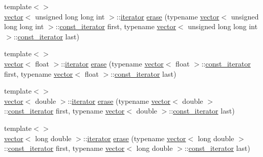 \begin{DoxyCompactItemize}
\item 
{\footnotesize template$<$$>$ }\\\mbox{\hyperlink{classvector}{vector}}$<$ unsigned long long int $>$\+::\mbox{\hyperlink{classvector_a35c955cacac6aacaa1e82874b1628865}{iterator}} \mbox{\hyperlink{classvector_a12ff8acbe48298ba7ed04be41cf6ca5f}{erase}} (typename \mbox{\hyperlink{classvector}{vector}}$<$ unsigned long long int $>$\+::\mbox{\hyperlink{classvector_a2fc97dce62b7053449cc868607540dba}{const\+\_\+iterator}} first, typename \mbox{\hyperlink{classvector}{vector}}$<$ unsigned long long int $>$\+::\mbox{\hyperlink{classvector_a2fc97dce62b7053449cc868607540dba}{const\+\_\+iterator}} last)
\item 
{\footnotesize template$<$$>$ }\\\mbox{\hyperlink{classvector}{vector}}$<$ float $>$\+::\mbox{\hyperlink{classvector_a35c955cacac6aacaa1e82874b1628865}{iterator}} \mbox{\hyperlink{classvector_a963ac95d7d6ee8c509f34f236fa17996}{erase}} (typename \mbox{\hyperlink{classvector}{vector}}$<$ float $>$\+::\mbox{\hyperlink{classvector_a2fc97dce62b7053449cc868607540dba}{const\+\_\+iterator}} first, typename \mbox{\hyperlink{classvector}{vector}}$<$ float $>$\+::\mbox{\hyperlink{classvector_a2fc97dce62b7053449cc868607540dba}{const\+\_\+iterator}} last)
\item 
{\footnotesize template$<$$>$ }\\\mbox{\hyperlink{classvector}{vector}}$<$ double $>$\+::\mbox{\hyperlink{classvector_a35c955cacac6aacaa1e82874b1628865}{iterator}} \mbox{\hyperlink{classvector_aedb912479ddd3d0430711f983b47d664}{erase}} (typename \mbox{\hyperlink{classvector}{vector}}$<$ double $>$\+::\mbox{\hyperlink{classvector_a2fc97dce62b7053449cc868607540dba}{const\+\_\+iterator}} first, typename \mbox{\hyperlink{classvector}{vector}}$<$ double $>$\+::\mbox{\hyperlink{classvector_a2fc97dce62b7053449cc868607540dba}{const\+\_\+iterator}} last)
\item 
{\footnotesize template$<$$>$ }\\\mbox{\hyperlink{classvector}{vector}}$<$ long double $>$\+::\mbox{\hyperlink{classvector_a35c955cacac6aacaa1e82874b1628865}{iterator}} \mbox{\hyperlink{classvector_a89cfbc1cfa9c97cea5be305079b90b65}{erase}} (typename \mbox{\hyperlink{classvector}{vector}}$<$ long double $>$\+::\mbox{\hyperlink{classvector_a2fc97dce62b7053449cc868607540dba}{const\+\_\+iterator}} first, typename \mbox{\hyperlink{classvector}{vector}}$<$ long double $>$\+::\mbox{\hyperlink{classvector_a2fc97dce62b7053449cc868607540dba}{const\+\_\+iterator}} last)

\end{DoxyCompactItemize}
